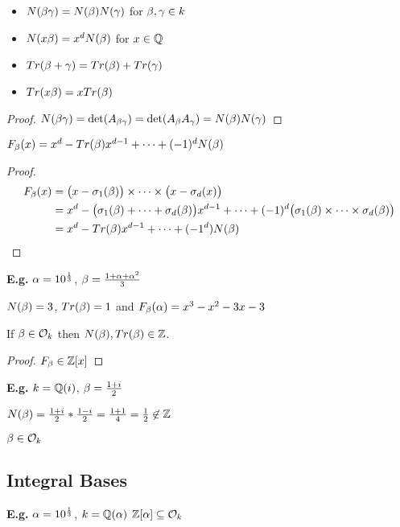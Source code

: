 \documentclass[11pt]{article}
\begin{document}
\begin{itemize}
	\item{$N(\beta\gamma) = N(\beta) N(\gamma) $ for $\beta, \gamma \in k$}
	\item{$N(x\beta) = x^dN(\beta)$ for $x \in \mathbb{Q}$}
	\item{$Tr(\beta+\gamma) = Tr(\beta) + Tr(\gamma)$}
	\item{$Tr(x\beta) = xTr(\beta)$}
\end{itemize}

\begin{proof}
	$N(\beta\gamma) = \det(A_{\beta\gamma}) = \det(A_\beta A_\gamma) = N(\beta) N(\gamma)$
\end{proof}

\begin{prop}
	$F_\beta(x) = x^d - Tr(\beta) x^{d-1} + \dots + (-1)^d N(\beta)$
\end{prop}
\begin{proof}
	\begin{align*}
		F_\beta(x) &= \big(x-\sigma_1(\beta)\big) \times\dots\times\big(x-\sigma_d(x)\big)\\
		& = x^d - \big( \sigma_1(\beta)+\dots + \sigma_d(\beta) \big) x^{d-1} + \dots + (-1)^d\big(\sigma_1(\beta)\times \dots \times \sigma_d(\beta)\big)\\
		&= x^d - Tr(\beta)x^{d-1} + \dots + (-1^d)N(\beta)
	\end{align*}
\end{proof}
\spac
\textbf{E.g.} $\alpha = 10^\frac{1}{3}$, $\beta = \frac{1+\alpha+\alpha^2}{3}$
\spa

$N(\beta) = 3$, $Tr(\beta) = 1$ and $F_\beta (\alpha) = x^3 -x^2 -3x -3$

\begin{cor}
	If $\beta \in \mathcal{O}_k$ then $N(\beta), Tr(\beta) \in \mathbb{Z}$.
\end{cor}

\begin{proof}
	$ F_\beta \in \mathbb{Z}[x]$
\end{proof}
\spa
\textbf{E.g.} $k = \mathbb{Q}(i)$, $\beta = \frac{1+i}{2}$
\spa

$N(\beta) = \frac{1+i}{2} * \frac{1-i}{2} = \frac{1+1}{4} = \frac{1}{2} \not \in \mathbb{Z}$
\spa

$ \beta \in \mathcal{O}_k$




\subsection{Integral Bases}

\textbf{E.g.} $\alpha = 10^{\frac{1}{3}}$, $k = \mathbb{Q}(\alpha)$ $\mathbb{Z}[\alpha] \subseteq \mathcal{O}_k$
\spa
\end{document}
